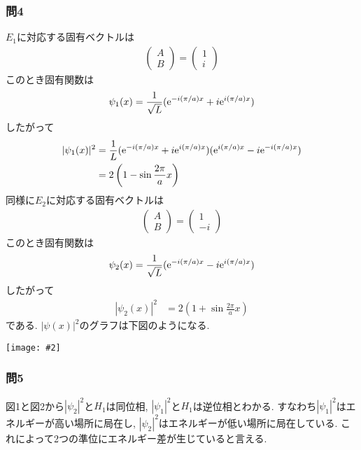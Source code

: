 \documentclass[uplatex,a4j,11pt,dvipdfmx]{jsarticle}
\makeatletter
\def\fgcaption{\def\@captype{figure}\caption}
\newcommand{\mfig}[3][width=15cm]{
\begin{center}
\texttt{[image: \#2]}
\fgcaption{#3 \label{fig:#2}}
\end{center}
}
\makeatother
\begin{document}
\subsubsection*{問4}
$E_1$に対応する固有ベクトルは
\begin{align}
  \left(\begin{array}{c}
    A\\B
  \end{array}\right)=
  \left(\begin{array}{c}
    1\\i
  \end{array}\right)
\end{align}
このとき固有関数は
\begin{align}
  \psi_1(x)=\frac{1}{\sqrt{L}}({\rm e}^{-i(\pi/a)x}+i{\rm e}^{i(\pi/a)x})
\end{align}
したがって
\begin{align}
  |\psi_1(x)|^2&=\frac{1}{L}({\rm e}^{-i(\pi/a)x}+i{\rm e}^{i(\pi/a)x})({\rm e}^{i(\pi/a)x}-i{\rm e}^{-i(\pi/a)x})\\
  &=2\left(1-\sin\frac{2\pi}{a}x\right)
\end{align}
同様に$E_2$に対応する固有ベクトルは
\begin{align}
  \left(\begin{array}{c}
    A\\B
  \end{array}\right)=
  \left(\begin{array}{c}
    1\\-i
  \end{array}\right)
\end{align}
このとき固有関数は
\begin{align}
  \psi_2(x)=\frac{1}{\sqrt{L}}({\rm e}^{-i(\pi/a)x}-i{\rm e}^{i(\pi/a)x})
\end{align}
したがって
\begin{align}
  |\psi_2(x)|^2&=2\left(1+\sin\frac{2\pi}{a}x\right)
\end{align}
である.
$|\psi(x)|^2$のグラフは下図のようになる.
\mfig[width=6cm]{fig/fig2.png}{$|\psi(x)|^2$のグラフ(青:$|\psi_1|^2$,赤:$|\psi_2|^2$)}
\subsubsection*{問5}
図1と図2から$|\psi_2|^2$と$H_1$は同位相,
$|\psi_1|^2$と$H_1$は逆位相とわかる.
すなわち$|\psi_1|^2$はエネルギーが高い場所に局在し,
$|\psi_2|^2$はエネルギーが低い場所に局在している.
これによって2つの準位にエネルギー差が生じていると言える.
\end{document}
